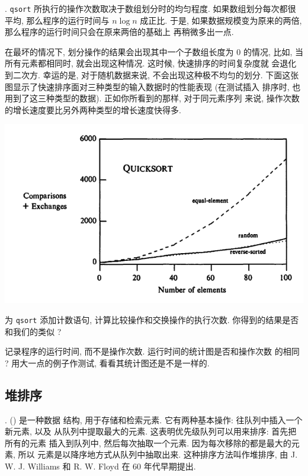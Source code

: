 . \texttt{qsort} 所执行的操作次数取决于数组划分时的均匀程度.
如果数组划分每次都很平均, 那么程序的运行时间与 $n \log n$ 成正比.
于是, 如果数据规模变为原来的两倍, 那么程序的运行时间只会在原来两倍的基础上
再稍微多出一点.

在最坏的情况下, 划分操作的结果会出现其中一个子数组长度为 0 的情况, 比如,
当所有元素都相同时, 就会出现这种情况. 这时候, 快速排序的时间复杂度就
会退化到二次方. 幸运的是, 对于随机数据来说, 不会出现这种极不均匀的划分. 
下面这张图显示了快速排序面对三种类型的输入数据时的性能表现 (在测试插入
排序时, 也用到了这三种类型的数据). 正如你所看到的那样, 对于同元素序列
来说, 操作次数的增长速度要比另外两种类型的增长速度快得多.

\begin{center}
    \includegraphics[scale=0.7]{images/quicksort.png}
\end{center}

\begin{exercise}
    为 \texttt{qsort} 添加计数语句, 计算比较操作和交换操作的执行次数.
    你得到的结果是否和我们的类似 ?
\end{exercise}

\begin{exercise}
    记录程序的运行时间, 而不是操作次数. 运行时间的统计图是否和操作次数
    的相同 ? 用大一点的例子作测试, 看看其统计图还是不是一样的.
\end{exercise}

\subsection{堆排序}
\label{subsec:heapsort}

.  () 是一种数据
结构, 用于存储和检索元素. 它有两种基本操作: 往队列中插入一个新元素, 以及 
从队列中提取最大的元素. 这表明优先级队列可以用来排序: 首先把所有的元素
插入到队列中, 然后每次抽取一个元素. 因为每次移除的都是最大的元素, 所以 
元素是以降序地方式从队列中抽取出来. 这种排序方法叫作堆排序, 由
J. W. J. Williams 和 R. W. Floyd 在 60 年代早期提出.

